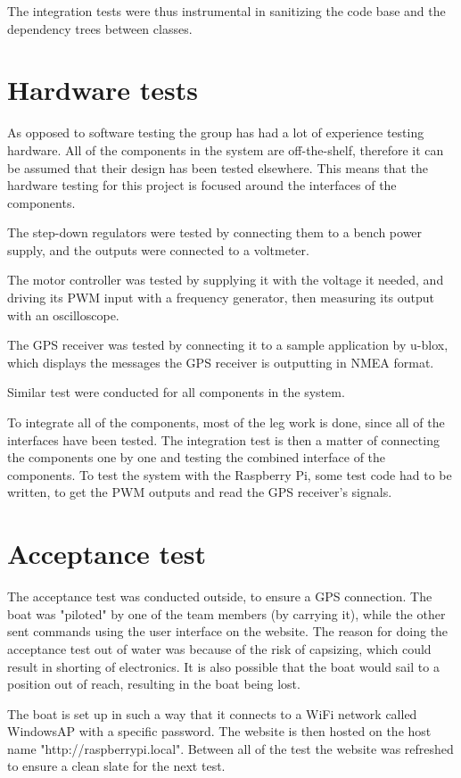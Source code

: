 The integration tests were thus instrumental in sanitizing the code base and the dependency trees between classes.

\section{Hardware tests}
As opposed to software testing the group has had a lot of experience testing hardware. All of the components in the system are off-the-shelf, therefore it can be assumed that their design has been tested elsewhere. This means that the hardware testing for this project is focused around the interfaces of the components.

The step-down regulators were tested by connecting them to a bench power supply, and the outputs were connected to a voltmeter.

The motor controller was tested by supplying it with the voltage it needed, and driving its PWM input with a frequency generator, then measuring its output with an oscilloscope. 

The GPS receiver was tested by connecting it to a sample application by u-blox, which displays the messages the GPS receiver is outputting in NMEA format.

Similar test were conducted for all components in the system. 

To integrate all of the components, most of the leg work is done, since all of the interfaces have been tested. The integration test is then a matter of connecting the components one by one and testing the combined interface of the components. To test the system with the Raspberry Pi, some test code had to be written, to get the PWM outputs and read the GPS receiver's signals.


\section{Acceptance test}
The acceptance test was conducted outside, to ensure a GPS connection. The boat was "piloted" by one of the team members (by carrying it), while the other sent commands using the user interface on the website. The reason for doing the acceptance test out of water was because of the risk of capsizing, which could result in shorting of electronics. It is also possible that the boat would sail to a position out of reach, resulting in the boat being lost.

The boat is set up in such a way that it connects to a WiFi network called WindowsAP with a specific password. The website is then hosted on the host name "http://raspberrypi.local". Between all of the test the website was refreshed to ensure a clean slate for the next test.